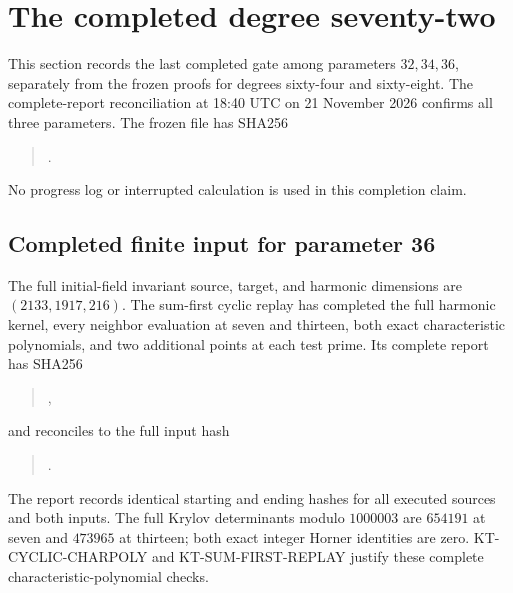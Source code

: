 \section{The completed degree seventy-two}
\label{sec:kt-last-vanishing}

This section records the last completed gate among parameters
$32,34,36$, separately from the frozen proofs for degrees
sixty-four and sixty-eight.  The complete-report reconciliation
at 18:40 UTC on 21 November 2026 confirms all three parameters.
The frozen file 
has SHA256
\begin{quote}\small
{}.
\end{quote}
No progress log or interrupted calculation is used in this
completion claim.

\subsection{Completed finite input for parameter 36}

The full initial-field invariant source, target, and harmonic
dimensions are $(2133,1917,216)$.  The sum-first cyclic replay
has completed the full harmonic kernel, every neighbor
evaluation at seven and thirteen, both exact characteristic
polynomials, and two additional points at each test prime.
Its complete report has SHA256
\begin{quote}\small
{},
\end{quote}
and reconciles to the full input hash
\begin{quote}\small
{}.
\end{quote}
The report records identical starting and ending hashes for
all executed sources and both inputs.  The full Krylov
determinants modulo $1000003$ are $654191$ at seven and
$473965$ at thirteen; both exact integer Horner identities
are zero.  KT-CYCLIC-CHARPOLY and KT-SUM-FIRST-REPLAY
justify these complete characteristic-polynomial checks.

